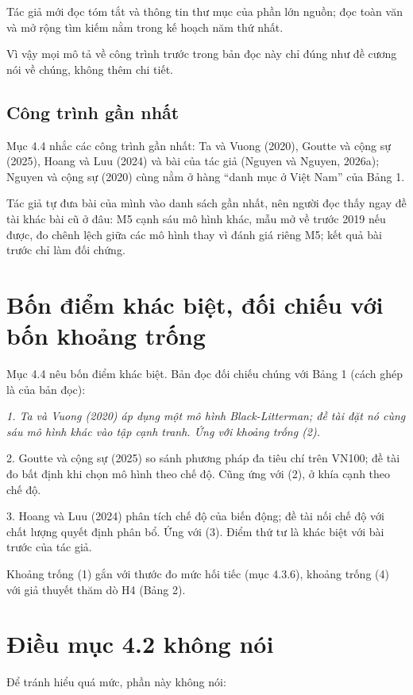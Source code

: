 Tác giả mới đọc tóm tắt và thông tin thư mục của phần lớn nguồn; đọc toàn văn và mở rộng tìm kiếm nằm trong kế hoạch năm thứ nhất.

Vì vậy mọi mô tả về công trình trước trong bản đọc này chỉ đúng như đề cương nói về chúng, không thêm chi tiết.

\subsection{Công trình gần nhất}

Mục 4.4 nhắc các công trình gần nhất: Ta và Vuong (2020), Goutte và cộng sự (2025), Hoang và Luu (2024) và bài của tác giả (Nguyen và Nguyen, 2026a); Nguyen và cộng sự (2020) cùng nằm ở hàng “danh mục ở Việt Nam” của Bảng 1.

Tác giả tự đưa bài của mình vào danh sách gần nhất, nên người đọc thấy ngay đề tài khác bài cũ ở đâu: M5 cạnh sáu mô hình khác, mẫu mở về trước 2019 nếu được, đo chênh lệch giữa các mô hình thay vì đánh giá riêng M5; kết quả bài trước chỉ làm đối chứng.

\section{Bốn điểm khác biệt, đối chiếu với bốn khoảng trống}

Mục 4.4 nêu bốn điểm khác biệt. Bản đọc đối chiếu chúng với Bảng 1 (cách ghép là của bản đọc):

{\itshape 1. Ta và Vuong (2020) áp dụng một mô hình Black-Litterman; đề tài đặt nó cùng sáu mô hình khác vào tập cạnh tranh. Ứng với khoảng trống (2).

2. Goutte và cộng sự (2025) so sánh phương pháp đa tiêu chí trên VN100; đề tài đo bất định khi chọn mô hình theo chế độ. Cũng ứng với (2), ở khía cạnh theo chế độ.

3. Hoang và Luu (2024) phân tích chế độ của biến động; đề tài nối chế độ với chất lượng quyết định phân bổ. Ứng với (3). Điểm thứ tư là khác biệt với bài trước của tác giả.\par}

Khoảng trống (1) gắn với thước đo mức hối tiếc (mục 4.3.6), khoảng trống (4) với giả thuyết thăm dò H4 (Bảng 2).

\section{Điều mục 4.2 không nói}

Để tránh hiểu quá mức, phần này không nói:

